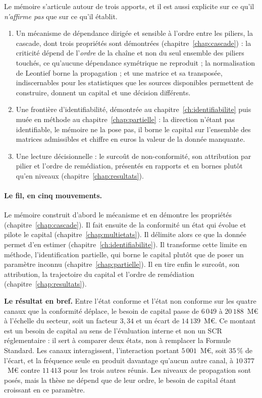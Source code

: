 Le mémoire s'articule autour de trois apports, et il est aussi explicite sur ce qu'il
\emph{n'affirme pas} que sur ce qu'il établit.

\begin{enumerate}[leftmargin=1.4em,itemsep=3pt]
\item Un mécanisme de dépendance dirigée et sensible à l'ordre entre les piliers, la cascade,
      dont trois propriétés sont démontrées (chapitre~\ref{chap:cascade}) : la criticité dépend
      de l'\emph{ordre} de la chaîne et non du seul ensemble des piliers touchés, ce qu'aucune
      dépendance symétrique ne reproduit ; la normalisation de Leontief borne la propagation ; et
      une matrice et sa transposée, indiscernables pour les statistiques que les sources
      disponibles permettent de construire, donnent un capital et une décision différents.
\item Une frontière d'identifiabilité, démontrée au chapitre~\ref{ch:identifiabilite} puis muée
      en méthode au chapitre~\ref{chap:partielle} : la direction n'étant pas identifiable, le
      mémoire ne la pose pas, il borne le capital sur l'ensemble des matrices admissibles et
      chiffre en euros la valeur de la donnée manquante.
\item Une lecture décisionnelle : le surcoût de non-conformité, son attribution par pilier et
      l'ordre de remédiation, présentés en rapports et en bornes plutôt qu'en niveaux
      (chapitre~\ref{chap:resultats}).
\end{enumerate}

\paragraph{Le fil, en cinq mouvements.} Le mémoire construit d'abord le mécanisme et en démontre
les propriétés (chapitre~\ref{chap:cascade}). Il fait ensuite de la conformité un état qui évolue
et pilote le capital (chapitre~\ref{chap:multietats}). Il délimite alors ce que la donnée permet
d'en estimer (chapitre~\ref{ch:identifiabilite}). Il transforme cette limite en méthode,
l'identification partielle, qui borne le capital plutôt que de poser un paramètre inconnu
(chapitre~\ref{chap:partielle}). Il en tire enfin le surcoût, son attribution, la trajectoire du
capital et l'ordre de remédiation (chapitre~\ref{chap:resultats}).

\begin{cle}
\textbf{Le résultat en bref.} Entre l'état conforme et l'état non conforme sur les quatre canaux
que la conformité déplace, le besoin de capital passe de $6\,049$ à $20\,188$~M\euro{} à
l'échelle du secteur, soit un facteur $3{,}34$ et un écart de $14\,139$~M\euro{}. Ce montant est
un besoin de capital au sens de l'évaluation interne et non un SCR réglementaire : il sert à
comparer deux états, non à remplacer la Formule Standard. Les canaux interagissent, l'interaction
portant $5\,001$~M\euro{}, soit $35\,\%$ de l'écart, et la fréquence seule en produit davantage
qu'aucun autre canal, à $10\,377$~M\euro{} contre $11\,413$ pour les trois autres réunis. Les
niveaux de propagation sont posés, mais la thèse ne dépend que de leur ordre, le besoin de
capital étant croissant en ce paramètre.
\end{cle}

